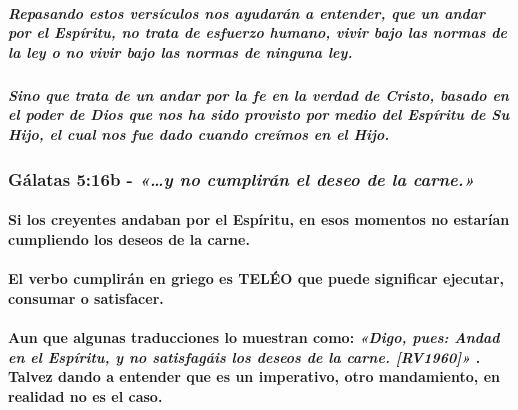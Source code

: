 \documentclass[11a pt,twoside]{article}
\newcommand{\scripture}[1]{%
  {\fontsize{12pt}{16pt}\selectfont\ScriptureFont\itshape #1}%
}
\let\oldsubsubsection\subsubsection
\renewcommand{\subsubsection}{\needspace{4\baselineskip}\oldsubsubsection}
\let\oldparagraph\paragraph
\renewcommand{\paragraph}{\needspace{3\baselineskip}\oldparagraph}
\let\oldsubparagraph\subparagraph
\renewcommand{\subparagraph}{\needspace{2\baselineskip}\oldsubparagraph}
\begin{document}
\subparagraph{Repasando estos versículos nos ayudarán a entender, que un
andar por el Espíritu, no trata de esfuerzo humano, vivir bajo las
normas de la ley o no vivir bajo las normas de ninguna
ley.}\label{repasando-estos-versuxedculos-nos-ayudaruxe1n-a-entender-que-un-andar-por-el-espuxedritu-no-trata-de-esfuerzo-humano-vivir-bajo-las-normas-de-la-ley-o-no-vivir-bajo-las-normas-de-ninguna-ley.}

\subparagraph{Sino que trata de un andar por la fe en la verdad de
Cristo, basado en el poder de Dios que nos ha sido provisto por medio
del Espíritu de Su Hijo, el cual nos fue dado cuando creímos en el
Hijo.}\label{sino-que-trata-de-un-andar-por-la-fe-en-la-verdad-de-cristo-basado-en-el-poder-de-dios-que-nos-ha-sido-provisto-por-medio-del-espuxedritu-de-su-hijo-el-cual-nos-fue-dado-cuando-creuxedmos-en-el-hijo.}

\subsubsection{\texorpdfstring{Gálatas 5:16b -
\scripture{«…y no cumplirán el deseo de la carne.»}}{Gálatas 5:16b - }}\label{guxe1latas-516b---y-no-cumpliruxe1n-el-deseo-de-la-carne.}

\paragraph{Si los creyentes andaban por el Espíritu, en esos momentos no
estarían cumpliendo los deseos de la
carne.}\label{si-los-creyentes-andaban-por-el-espuxedritu-en-esos-momentos-no-estaruxedan-cumpliendo-los-deseos-de-la-carne.}

\paragraph{El verbo cumplirán en griego es TELÉO que puede significar
ejecutar, consumar o
satisfacer.}\label{el-verbo-cumpliruxe1n-en-griego-es-teluxe9o-que-puede-significar-ejecutar-consumar-o-satisfacer.}

\paragraph{\texorpdfstring{Aun que algunas traducciones lo muestran
como:
\scripture{«Digo, pues: Andad en el Espíritu, y no satisfagáis los deseos de la carne. [RV1960]»}.
Talvez dando a entender que es un imperativo, otro mandamiento, en
realidad no es el
caso.}{Aun que algunas traducciones lo muestran como: . Talvez dando a entender que es un imperativo, otro mandamiento, en realidad no es el caso.}}\label{aun-que-algunas-traducciones-lo-muestran-como-digo-pues-andad-en-el-espuxedritu-y-no-satisfaguxe1is-los-deseos-de-la-carne.-rv1960.-talvez-dando-a-entender-que-es-un-imperativo-otro-mandamiento-en-realidad-no-es-el-caso.}
\end{document}
